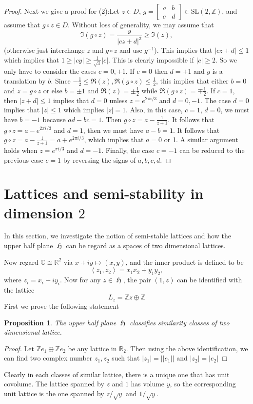 \documentclass[12pt]{article} %
\newtheorem{prop}[definition]{Proposition}
\DeclareMathOperator{\uH}{\mathfrak{H}}
\begin{document}
\begin{proof}
  Next we give a proof for (2):Let $z \in D$, $g = \begin{bmatrix} a & b \\ c & d \end{bmatrix} \in \mathrm{SL}(2, \mathbb{Z})$, and assume that $g \circ z \in D$. Without loss of generality, we may assume that
  \[
    \Im(g \circ z) = \frac{y}{|cz + d|^2} \geq \Im(z),
  \]
  (otherwise just interchange $z$ and $g \circ z$ and use $g^{-1}$). This implies that $|cz + d| \leq 1$ which implies that $1 \geq |cy| \geq \frac{1}{\sqrt{3}}|c|$. This is clearly impossible if $|c| \geq 2$. So we only have to consider the cases $c = 0, \pm 1$. If $c = 0$ then $d = \pm 1$ and $g$ is a translation by $b$. Since $-\frac{1}{2} \leq \Re(z), \Re(g \circ z) \leq \frac{1}{2}$, this implies that either $b = 0$ and $z = g \circ z$ or else $b = \pm 1$ and $\Re(z) = \pm \frac{1}{2}$ while $\Re(g \circ z) = \mp \frac{1}{2}$. If $c = 1$, then $|z + d| \leq 1$ implies that $d = 0$ unless $z = e^{2\pi i / 3}$ and $d = 0, -1$. The case $d = 0$ implies that $|z| \leq 1$ which implies $|z| = 1$. Also, in this case, $c = 1$, $d = 0$, we must have $b = -1$ because $ad - bc = 1$. Then $g \circ z = a - \frac{1}{z + 1}$. It follows that $g \circ z = a - e^{2\pi i / 3}$ and $d = 1$, then we must have $a - b = 1$. It follows that $g \circ z = a - \frac{1}{z + 1} = a + e^{2\pi i / 3}$, which implies that $a = 0$ or 1. A similar argument holds when $z = e^{\pi i / 3}$ and $d = -1$. Finally, the case $c = -1$ can be reduced to the previous case $c = 1$ by reversing the signs of $a, b, c, d$.
\end{proof}
\section{Lattices and semi-stability in dimension $2$}
In this section, we investigate the notion of semi-stable lattices and how the
upper half plane $\uH$ can be regard as a spaces of two dimensional lattices.

Now regard $\mathbb{C} \cong \mathbb{R}^2$ via $x+iy \mapsto (x,y)$, and the inner product is defined to be
\[\left\langle z_1, z_2 \right\rangle = x_1x_2 + y_1y_2,\]
where $z_i= x_i+iy_i$. Now for any $z \in \uH$, the pair $(1,z)$ can be identified with the lattice
\[L_z = \mathbb{Z}z \oplus \mathbb{Z}\]
First we prove the following statement
\begin{prop}
  The upper half plane $\uH$ classifies similarity classes of two dimensional lattice.
\end{prop}
\begin{proof}
  Let $\mathbb{Z}e_1\oplus \mathbb{Z}e_2$ be any lattice in $\mathbb{R}_2$. Then using the
  above identification, we can find two complex number $z_1,z_2$ such that $|z_1| = ||e_1||$ and
  $|z_2| = \lvert e_2 \rvert$
\end{proof}
Clearly in each classes of similar lattice, there is a unique one that has unit covolume.
The lattice spanned by $z$ and $1$ has volume $y$, so the corresponding unit lattice is the one spanned
by $z/\sqrt{y}$ and $1/\sqrt{y}$.
\end{document}
